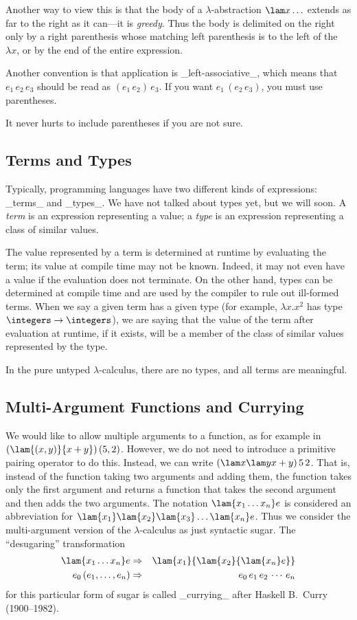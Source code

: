 Another way to view this is that the body of a $\lambda$-abstraction $\lam x\ldots$ extends as
far to the right as it can---it is \emph{greedy}. Thus the body
is delimited on the right only by a right parenthesis whose matching
left parenthesis is to the left of the $\lambda x$, or by the end of the entire expression.

Another convention is that application is _left-associative_, which
means that $e_1\,e_2\,e_3$ should be read as $(e_1\,e_2)\,e_3$.
If you want $e_1\,(e_2\,e_3)$, you must use parentheses. 

It never hurts to include parentheses if you are not sure. 

\subsection{Terms and Types}

Typically, programming languages have two different kinds of expressions:
_terms_ and _types_. We have not talked about types yet, but we will soon.
A \emph{term} is an expression representing a value;
a \emph{type} is an expression representing a class of similar values.

The value represented by a term is determined at runtime by evaluating the term; its value at
compile time may not be known. Indeed, it may not even have a value if the evaluation does not
terminate. On the other hand, types can be determined at compile time and are used by the compiler to rule
out ill-formed terms. When we say a given term has a given type (for example, $\lambda x.x^2$ has type
$\integers\to\integers$), we are saying that the value of the term after evaluation at runtime,
if it exists, will be a member of the class of similar values represented by the type.

In the pure untyped $\lambda$-calculus, there are no types, and all terms are meaningful.

\subsection{Multi-Argument Functions and Currying}

We would like to allow multiple arguments to a function, as for example in $(\lam{(x,y)}{x+y})\,(5,2)$. However, we do not need to introduce a primitive pairing operator to do this. Instead, we can write $(\lam x{\lam y{x+y}})\,5\,2$. That is, instead of the function taking two arguments and adding them, the function takes only the first argument and returns a function that takes the second argument and then adds the two arguments. The notation $\lam{x_1\ldots x_n}e$ is considered an abbreviation for $\lam{x_1}\lam{x_2}\lam{x_3}\ldots\lam{x_n}e$. Thus we consider the multi-argument version of the $\lambda$-calculus as just syntactic sugar. The ``desugaring'' transformation
\begin{eqnarray*}
\lam{x_1\ldots x_n}e & \Rightarrow & \lam{x_1}{\lam{x_2}{\lam{x_n}e}}\\
e_0\,(e_1,\ldots,e_n) & \Rightarrow & e_0\,e_1\,e_2\,\cdots\,e_n
\end{eqnarray*}
for this particular form of sugar is called _currying_ after Haskell B.~Curry (1900--1982).

